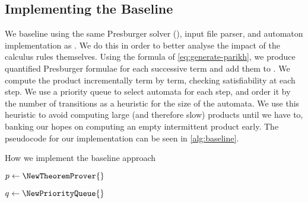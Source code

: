 \documentclass[acmsmall,review,anonymous,screen]{acmart}\settopmatter{printfolios=true,printccs=true,printacmref=true}
\theoremstyle{definition}
\begin{document}
\subsection{Implementing the Baseline}\label{sec:implementing-baseline}

We baseline using the same Presburger solver (\Princess{}), input file parser,
and automaton implementation as \Catra. We do this in order to better analyse
the impact of the calculus rules themselves. Using the formula of
\eqref{eq:generate-parikh}, we produce quantified Presburger formulae for each
successive term and add them to \Princess. We compute the product incrementally
term by term, checking satisfiability at each step. We use a priority queue to
select automata for each step, and order it by the number of transitions as a
heuristic for the size of the automata. We use this heuristic to avoid computing
large (and therefore slow) products until we have to, banking our hopes on
computing an empty intermittent product early. The pseudocode for our
implementation can be seen in \cref{alg:baseline}.

\begin{algorithm}
  \caption{How we implement the baseline approach}\label{alg:baseline}

  $p \gets \NewTheoremProver{}$



  $q \gets \NewPriorityQueue{}$


  

  \end{algorithm}
\end{document}
